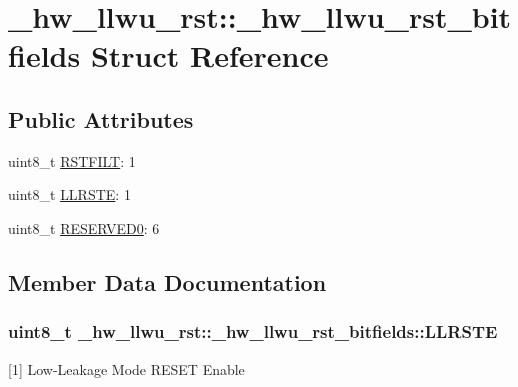 \hypertarget{struct__hw__llwu__rst_1_1__hw__llwu__rst__bitfields}{}\section{\+\_\+hw\+\_\+llwu\+\_\+rst\+:\+:\+\_\+hw\+\_\+llwu\+\_\+rst\+\_\+bitfields Struct Reference}
\label{struct__hw__llwu__rst_1_1__hw__llwu__rst__bitfields}
\subsection*{Public Attributes}
\begin{DoxyCompactItemize}
\item 
uint8\+\_\+t \hyperlink{struct__hw__llwu__rst_1_1__hw__llwu__rst__bitfields_a01cc751dffb5e790ae8d84c15335e840}{R\+S\+T\+F\+I\+LT}\+: 1
\item 
uint8\+\_\+t \hyperlink{struct__hw__llwu__rst_1_1__hw__llwu__rst__bitfields_a62067bda4bdac67b3c9687e9ede0845c}{L\+L\+R\+S\+TE}\+: 1
\item 
uint8\+\_\+t \hyperlink{struct__hw__llwu__rst_1_1__hw__llwu__rst__bitfields_a298570a5081dd64611bda13729d155f1}{R\+E\+S\+E\+R\+V\+E\+D0}\+: 6
\end{DoxyCompactItemize}


\subsection{Member Data Documentation}
\subsubsection[{\texorpdfstring{L\+L\+R\+S\+TE}{LLRSTE}}]{\setlength{\rightskip}{0pt plus 5cm}uint8\+\_\+t \+\_\+hw\+\_\+llwu\+\_\+rst\+::\+\_\+hw\+\_\+llwu\+\_\+rst\+\_\+bitfields\+::\+L\+L\+R\+S\+TE}\hypertarget{struct__hw__llwu__rst_1_1__hw__llwu__rst__bitfields_a62067bda4bdac67b3c9687e9ede0845c}{}\label{struct__hw__llwu__rst_1_1__hw__llwu__rst__bitfields_a62067bda4bdac67b3c9687e9ede0845c}
\mbox{[}1\mbox{]} Low-\/\+Leakage Mode R\+E\+S\+ET Enable 
